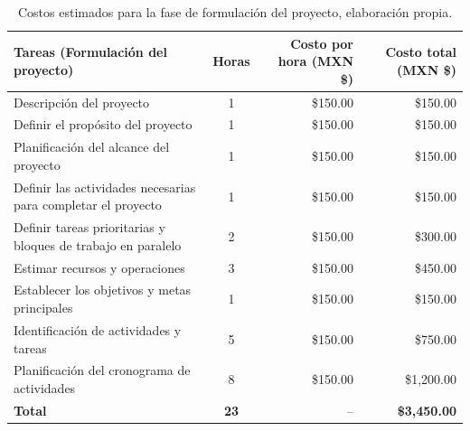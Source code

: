\begin{table}[H]
	\centering
	\renewcommand{\arraystretch}{1.6}
	\setlength{\tabcolsep}{10pt}
	\Huge
	\begin{adjustbox}{max width=\textwidth}
		\begin{tabular}{|p{8cm}|c|r|r|}
			\hline
			\textbf{Tareas (Formulación del proyecto)} & \textbf{Horas} & \textbf{Costo por hora (MXN \$)} & \textbf{Costo total (MXN \$)} \\ \hline
			Descripción del proyecto & 1 & \$150.00 & \$150.00 \\ \hline
			Definir el propósito del proyecto & 1 & \$150.00 & \$150.00 \\ \hline
			Planificación del alcance del proyecto & 1 & \$150.00 & \$150.00 \\ \hline
			Definir las actividades necesarias para completar el proyecto & 1 & \$150.00 & \$150.00 \\ \hline
			Definir tareas prioritarias y bloques de trabajo en paralelo & 2 & \$150.00 & \$300.00 \\ \hline
			Estimar recursos y operaciones & 3 & \$150.00 & \$450.00 \\ \hline
			Establecer los objetivos y metas principales & 1 & \$150.00 & \$150.00 \\ \hline
			Identificación de actividades y tareas & 5 & \$150.00 & \$750.00 \\ \hline
			Planificación del cronograma de actividades & 8 & \$150.00 & \$1,200.00 \\ \hline
			\textbf{Total} & \textbf{23} & -- & \textbf{\$3,450.00} \\ \hline
		\end{tabular}
	\end{adjustbox}
	\caption[Costos estimados para la fase de formulación del proyecto]{Costos estimados para la fase de formulación del proyecto, elaboración propia.} 	
	\label{tab:costos_formulacion_nuevo}
\end{table}


